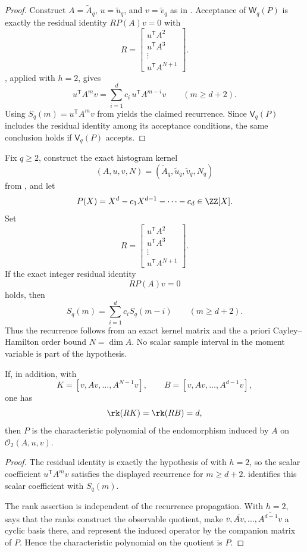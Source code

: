 \begin{proof}
Construct \(A=\widetilde A_q\), \(u=\widetilde u_q\), and
\(v=\widetilde v_q\) as in .  Acceptance of
\(\mathsf W_q(P)\) is exactly the residual identity \(RP(A)v=0\) with
\[
  R=
  \begin{bmatrix}
  u^{\mathsf T}A^2\\
  u^{\mathsf T}A^3\\
  \vdots\\
  u^{\mathsf T}A^{N+1}
  \end{bmatrix}.
\]
, applied with \(h=2\), gives
\[
  u^{\mathsf T}A^m v
  =
  \sum_{i=1}^d c_i\,u^{\mathsf T}A^{m-i}v
  \qquad(m\ge d+2).
\]
Using \(S_q(m)=u^{\mathsf T}A^mv\) from
 yields the claimed recurrence.  Since
\(\mathsf V_q(P)\) includes the residual identity among its acceptance
conditions, the same conclusion holds if \(\mathsf V_q(P)\) accepts.
\end{proof}

\begin{theorem}
\label{thm:apriori-exact-kernel-certification}
Fix \(q\ge2\), construct the exact histogram kernel
\[
  (A,u,v,N)=(\widetilde A_q,\widetilde u_q,\widetilde v_q,N_q)
\]
from , and let
\[
  P(X)=X^d-c_1X^{d-1}-\cdots-c_d\in\ZZ[X].
\]
Set
\[
  R=
  \begin{bmatrix}
  u^{\mathsf T}A^2\\
  u^{\mathsf T}A^3\\
  \vdots\\
  u^{\mathsf T}A^{N+1}
  \end{bmatrix}.
\]
If the exact integer residual identity
\[
  RP(A)v=0
\]
holds, then
\[
  S_q(m)=\sum_{i=1}^d c_iS_q(m-i)
  \qquad(m\ge d+2).
\]
Thus the recurrence follows from an exact kernel matrix and the a priori
Cayley--Hamilton order bound \(N=\dim A\).  No scalar sample interval in the
moment variable is part of the hypothesis.

If, in addition, with
\[
  K=[v,Av,\dots,A^{N-1}v],
  \qquad
  B=[v,Av,\dots,A^{d-1}v],
\]
one has
\[
  \rk(RK)=\rk(RB)=d,
\]
then \(P\) is the characteristic polynomial of the endomorphism induced by
\(A\) on \(\mathcal O_2(A,u,v)\).
\end{theorem}

\begin{proof}
The residual identity is exactly the hypothesis of
 with \(h=2\), so the scalar coefficient
\(u^{\mathsf T}A^m v\) satisfies the displayed recurrence for \(m\ge d+2\).
 identifies this scalar coefficient with
\(S_q(m)\).

The rank assertion is independent of the recurrence propagation.  With \(h=2\),
 says that the ranks construct
the observable quotient, make
\(\overline v,\overline{Av},\dots,\overline{A^{d-1}v}\) a cyclic basis there,
and represent the induced operator by the companion matrix of \(P\).  Hence the
characteristic polynomial on the quotient is \(P\).
\end{proof}
